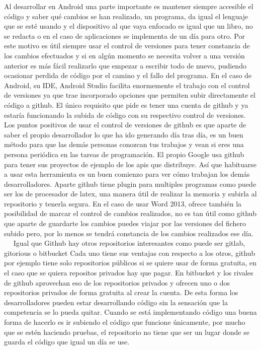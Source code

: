 Al desarrollar en Android una parte importante es mantener siempre accesible el código y saber qué cambios se han realizado, un programa, da igual el lenguaje que se esté usando y el dispositivo al que vaya enfocado es igual que un libro, no se redacta o en el caso de aplicaciones se implementa de un día para otro. Por este motivo es útil siempre usar el control de versiones para tener constancia de los cambios efectuados y si en algún momento se necesita volver a una versión anterior es más fácil realizarlo que empezar a escribir todo de nuevo, pudiendo ocasionar perdida de código por el camino y el fallo del programa.
En el caso de Android, su IDE, Android Studio facilita enormemente el trabajo con el control de versiones ya que trae incorporado opciones que permiten subir directamente el código a github. El único requisito que pide es tener una cuenta de github y ya estaría funcionando la subida de código con su respectivo control de versiones.
Los puntos positivos de usar el control de versiones de github es que aparte de saber el propio desarrollador lo que ha ido generando día tras día, es un buen método para que las demás personas conozcan tus trabajos y vean si eres una persona periódica en las tareas de programación.
El propio Google usa github para tener sus proyectos de ejemplo de los apis que distribuye. Así que habituarse a usar esta herramienta es un buen comienzo para ver cómo trabajan los demás desarrolladores.
Aparte github tiene plugin para multiples programas como puede ser los de procesador de latex, una manera útil de realizar la memoria y subirla al repositorio y tenerla segura.
En el caso de usar Word 2013, ofrece también la posibilidad de marcar el control de cambios realizados, no es tan útil como github que aparte de guardarte los cambios puedes viajar por las versiones del fichero subido pero, por lo menos se tendrá constancia de los cambios realizados ese día.
 
Igual que Github hay otros repositorios interesantes como puede ser gitlab, gitorious o bitbucket
Cada uno tiene sus ventajas con respecto a los otros, github por ejemplo tiene solo repositorios públicos si se quiere usar de forma gratuita, en el caso que se quiera repositos privados hay que pagar.
En bitbucket y los rivales de github aprovechan eso de los repositorios privados y ofrecen uno o dos repositorios privados de forma gratuita al crear la cuenta.
De esta forma los desarrolladores pueden estar desarrollando código sin la sensación que la competencia se lo pueda quitar.
Cuando se está implementando código una buena forma de hacerlo es ir subiendo el código que funcione únicamente, por mucho que se estén haciendo pruebas, el repositorio no tiene que ser un lugar donde se guarda el código que igual un día se use. 
